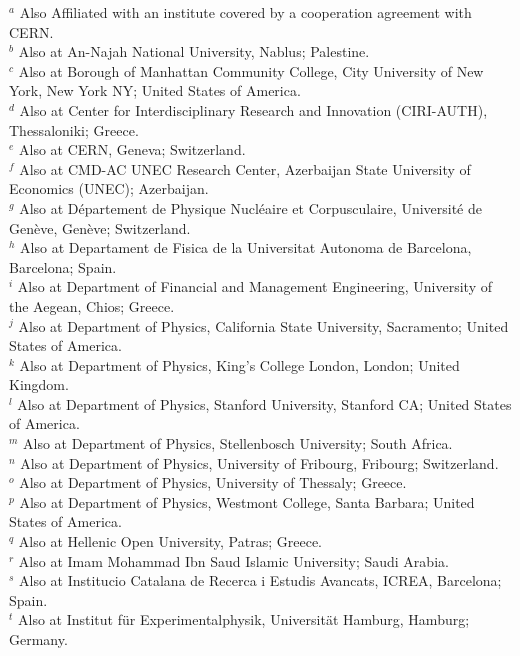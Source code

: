 \begin{flushleft}
$^{a}$ Also Affiliated with an institute covered by a cooperation agreement with CERN.\\
$^{b}$ Also at An-Najah National University, Nablus; Palestine.\\
$^{c}$ Also at Borough of Manhattan Community College, City University of New York, New York NY; United States of America.\\
$^{d}$ Also at Center for Interdisciplinary Research and Innovation (CIRI-AUTH), Thessaloniki; Greece.\\
$^{e}$ Also at CERN, Geneva; Switzerland.\\
$^{f}$ Also at CMD-AC UNEC Research Center, Azerbaijan State University of Economics (UNEC); Azerbaijan.\\
$^{g}$ Also at D\'epartement de Physique Nucl\'eaire et Corpusculaire, Universit\'e de Gen\`eve, Gen\`eve; Switzerland.\\
$^{h}$ Also at Departament de Fisica de la Universitat Autonoma de Barcelona, Barcelona; Spain.\\
$^{i}$ Also at Department of Financial and Management Engineering, University of the Aegean, Chios; Greece.\\
$^{j}$ Also at Department of Physics, California State University, Sacramento; United States of America.\\
$^{k}$ Also at Department of Physics, King's College London, London; United Kingdom.\\
$^{l}$ Also at Department of Physics, Stanford University, Stanford CA; United States of America.\\
$^{m}$ Also at Department of Physics, Stellenbosch University; South Africa.\\
$^{n}$ Also at Department of Physics, University of Fribourg, Fribourg; Switzerland.\\
$^{o}$ Also at Department of Physics, University of Thessaly; Greece.\\
$^{p}$ Also at Department of Physics, Westmont College, Santa Barbara; United States of America.\\
$^{q}$ Also at Hellenic Open University, Patras; Greece.\\
$^{r}$ Also at Imam Mohammad Ibn Saud Islamic University; Saudi Arabia.\\
$^{s}$ Also at Institucio Catalana de Recerca i Estudis Avancats, ICREA, Barcelona; Spain.\\
$^{t}$ Also at Institut f\"{u}r Experimentalphysik, Universit\"{a}t Hamburg, Hamburg; Germany.\\

\end{flushleft}
